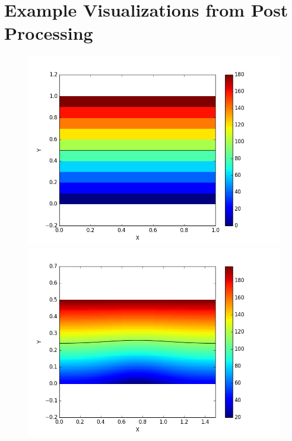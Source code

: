 \documentclass{article}
\begin{document}
\section{Example Visualizations from Post Processing}
\begin{figure}[!htb]
\vspace*{-4cm}
\centering
\includegraphics[scale=0.5]{solution009plot.png}
\label{fig:plot0}
\includegraphics[scale=0.5]{solution132plot.png}
\label{fig:plot1}

\end{figure}
\end{document}
